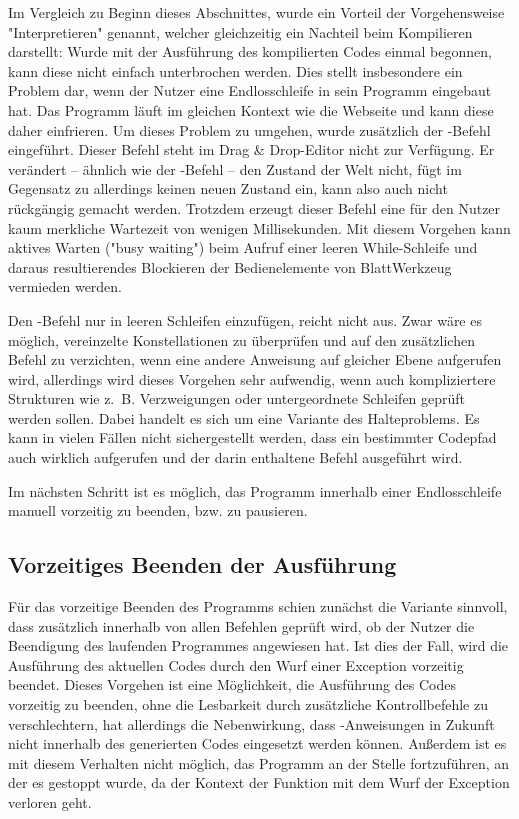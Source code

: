Im Vergleich zu Beginn dieses Abschnittes, wurde ein Vorteil der Vorgehensweise "Interpretieren" genannt, welcher gleichzeitig ein Nachteil beim Kompilieren darstellt: Wurde mit der Ausführung des kompilierten Codes einmal begonnen, kann diese nicht einfach unterbrochen werden. Dies stellt insbesondere ein Problem dar, wenn der Nutzer eine Endlosschleife in sein Programm eingebaut hat. Das Programm läuft im gleichen Kontext wie die Webseite und kann diese daher einfrieren. Um dieses Problem zu umgehen, wurde zusätzlich der -Be\-fehl eingeführt. Dieser Befehl steht im Drag \& Drop-Edi\-tor nicht zur Verfügung. Er verändert -- ähnlich wie der -Be\-fehl -- den Zustand der Welt nicht, fügt im Gegensatz zu  allerdings keinen neuen Zustand ein, kann also auch nicht rückgängig gemacht werden. Trotzdem erzeugt dieser Befehl eine für den Nutzer kaum merkliche Wartezeit von wenigen Millisekunden. Mit diesem Vorgehen kann aktives Warten ("busy waiting") beim Aufruf einer leeren While-Schlei\-fe und daraus resultierendes Blockieren der Bedienelemente von BlattWerkzeug vermieden werden.

Den -Be\-fehl nur in leeren Schleifen einzufügen, reicht nicht aus. Zwar wäre es möglich, vereinzelte Konstellationen zu überprüfen und auf den zusätzlichen Befehl zu verzichten, wenn eine andere Anweisung auf gleicher Ebene aufgerufen wird, allerdings wird dieses Vorgehen sehr aufwendig, wenn auch kompliziertere Strukturen wie z.~B. Verzweigungen oder untergeordnete Schleifen geprüft werden sollen. Dabei handelt es sich um eine Variante des Halteproblems. Es kann in vielen Fällen nicht sichergestellt werden, dass ein bestimmter Codepfad auch wirklich aufgerufen und der darin enthaltene Befehl ausgeführt wird.

Im nächsten Schritt ist es möglich, das Programm innerhalb einer Endlosschleife manuell vorzeitig zu beenden, bzw. zu pausieren.

\subsection{Vorzeitiges Beenden der Ausführung}
\label{sec:implementation:evaluation:pause}

Für das vorzeitige Beenden des Programms schien zunächst die Variante sinnvoll, dass zusätzlich innerhalb von allen Befehlen geprüft wird, ob der Nutzer die Beendigung des laufenden Programmes angewiesen hat. Ist dies der Fall, wird die Ausführung des aktuellen Codes durch den Wurf einer Exception vorzeitig beendet. Dieses Vorgehen ist eine Möglichkeit, die Ausführung des Codes vorzeitig zu beenden, ohne die Lesbarkeit durch zusätzliche Kontrollbefehle zu verschlechtern, hat allerdings die Nebenwirkung, dass -An\-wei\-sungen in Zukunft nicht innerhalb des generierten Codes eingesetzt werden können. Außerdem ist es mit diesem Verhalten nicht möglich, das Programm an der Stelle fortzuführen, an der es gestoppt wurde, da der Kontext der Funktion mit dem Wurf der Exception verloren geht.

